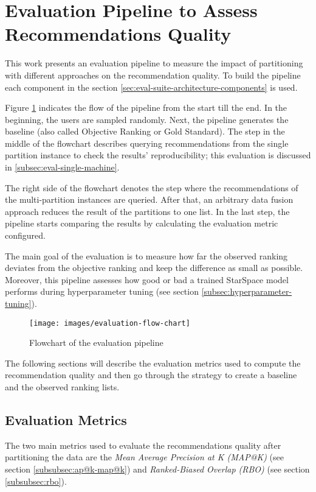 \section{Evaluation Pipeline to Assess Recommendations Quality}
\label{sec:evaluation-pipeline}
This work presents an evaluation pipeline to measure the impact of partitioning with different approaches on the recommendation quality. To build the pipeline each component in the section \ref{sec:eval-suite-architecture-components} is used. 

Figure \ref{fig:flowchart-evaluation-pipeline} indicates the flow of the pipeline from the start till the end. In the beginning, the users are sampled randomly. Next, the pipeline generates the baseline (also called Objective Ranking or Gold Standard). The step in the middle of the flowchart describes querying recommendations from the single partition instance to check the results' reproducibility; this evaluation is discussed in \ref{subsec:eval-single-machine}. 


The right side of the flowchart denotes the step where the recommendations of the multi-partition instances are queried. After that, an arbitrary data fusion approach reduces the result of the partitions to one list. In the last step, the pipeline starts comparing the results by calculating the evaluation metric configured. 

The main goal of the evaluation is to measure how far the observed ranking deviates from the objective ranking and keep the difference as small as possible. Moreover, this pipeline assesses how good or bad a trained StarSpace model performs during hyperparameter tuning (see section \ref{subsec:hyperparameter-tuning}).

\begin{figure}[!htb]
    \centering
    \texttt{[image: images/evaluation-flow-chart]}
    \caption{Flowchart of the evaluation pipeline}
    \label{fig:flowchart-evaluation-pipeline}
\end{figure}

The following sections will describe the evaluation metrics used to compute the recommendation quality and then go through the strategy to create a baseline and the observed ranking lists.

\subsection{Evaluation Metrics}
\label{subsec:evaluation-metrics-for-recommendation-quality}
The two main metrics used to evaluate the recommendations quality after partitioning the data are the \emph{Mean Average Precision at K (MAP@K)} (see section \ref{subsubsec:ap@k-map@k})  and \emph{Ranked-Biased Overlap (RBO)} (see section \ref{subsubsec:rbo}). 


